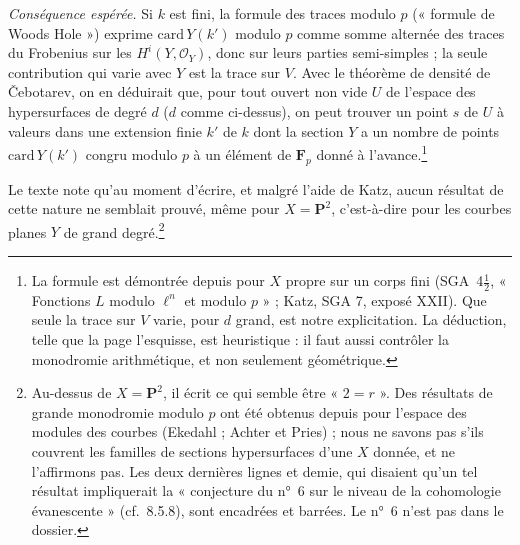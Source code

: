 \documentclass[11pt,a4paper]{article}
\begin{document}
\emph{Conséquence espérée.} Si $k$ est fini, la formule des traces modulo
$p$ (« formule de Woods Hole ») exprime $\mathrm{card}\, Y(k')$ modulo $p$
comme somme alternée des traces du Frobenius sur les
$H^{i}(Y, \mathcal{O}_{Y})$, donc sur leurs parties semi-simples ; la seule
contribution qui varie avec $Y$ est la trace sur $V$. Avec le théorème de
densité de Čebotarev, on en déduirait que, pour tout ouvert non vide $U$ de
l'espace des hypersurfaces de degré $d$ ($d$ comme ci-dessus), on peut
trouver un point $s$ de $U$ à valeurs dans une extension finie $k'$ de $k$
dont la section $Y$ a un nombre de points $\mathrm{card}\, Y(k')$ congru
modulo $p$ à un élément de $\mathbf{F}_{p}$ donné à
l'avance.\footnote{La formule est démontrée depuis pour $X$ propre sur un
corps fini (SGA~4$\frac{1}{2}$, « Fonctions $L$ modulo $\ell^{n}$ et modulo
$p$ » ; Katz, SGA 7, exposé XXII). Que seule la trace sur $V$ varie, pour $d$
grand, est notre explicitation. La déduction, telle que la page l'esquisse,
est heuristique : il faut aussi contrôler la monodromie arithmétique, et non
seulement géométrique.}

Le texte note qu'au moment d'écrire, et malgré l'aide de Katz, aucun
résultat de cette nature ne semblait prouvé, même pour $X = \mathbf{P}^{2}$,
c'est-à-dire pour les courbes planes $Y$ de grand degré.\footnote{Au-dessus
de $X = \mathbf{P}^{2}$, il écrit ce qui semble être « $2 = r$ ». Des
résultats de grande monodromie modulo $p$ ont été obtenus depuis pour
l'espace des modules des courbes (Ekedahl ; Achter et Pries) ; nous ne
savons pas s'ils couvrent les familles de sections hypersurfaces d'une $X$
donnée, et ne l'affirmons pas. Les deux dernières lignes et demie, qui
disaient qu'un tel résultat impliquerait la « conjecture du n°~6 sur le
niveau de la cohomologie évanescente » (cf.\ 8.5.8), sont encadrées et
barrées. Le n°~6 n'est pas dans le dossier.}
\end{document}

